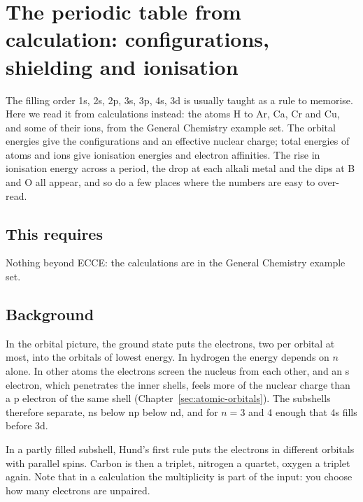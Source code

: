 \chapter{The periodic table from calculation: configurations, shielding and ionisation}
\label{sec:periodic-trends}
\label{sec:configurations}

The filling order 1s, 2s, 2p, 3s, 3p, 4s, 3d is usually taught as a rule to memorise. Here we read it from calculations instead: the atoms H to Ar, Ca, Cr and Cu, and some of their ions, from the General Chemistry example set. The orbital energies give the configurations and an effective nuclear charge; total energies of atoms and ions give ionisation energies and electron affinities. The rise in ionisation energy across a period, the drop at each alkali metal and the dips at B and O all appear, and so do a few places where the numbers are easy to over-read.

\section*{This requires}
Nothing beyond ECCE: the calculations are in the General Chemistry example set.

\section{Background}
In the orbital picture, the ground state puts the electrons, two per orbital at most, into the orbitals of lowest energy. In hydrogen the energy depends on $n$ alone. In other atoms the electrons screen the nucleus from each other, and an s electron, which penetrates the inner shells, feels more of the nuclear charge than a p electron of the same shell (Chapter~\ref{sec:atomic-orbitals}). The subshells therefore separate, ns below np below nd, and for $n = 3$ and 4 enough that 4s fills before 3d.

In a partly filled subshell, Hund's first rule puts the electrons in different orbitals with parallel spins. Carbon is then a triplet, nitrogen a quartet, oxygen a triplet again. Note that in a calculation the multiplicity is part of the input: you choose how many electrons are unpaired.

